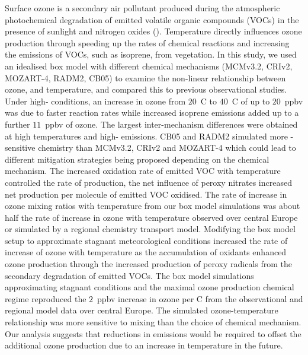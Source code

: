 Surface ozone is a secondary air pollutant produced during the atmospheric photochemical degradation of emitted volatile organic compounds (VOCs) in the presence of sunlight and nitrogen oxides (). 
Temperature directly influences ozone production through speeding up the rates of chemical reactions and increasing the emissions of VOCs, such as isoprene, from vegetation.
In this study, we used an idealised box model with different chemical mechanisms (MCMv3.2, CRIv2, MOZART-4, RADM2, CB05) to examine the non-linear relationship between ozone,  and temperature, and compared this to previous observational studies.
Under high- conditions, an increase in ozone from $20$~\degree C to $40$~\degree C of up to $20$~ppbv was due to faster reaction rates while increased isoprene emissions added up to a further $11$~ppbv of ozone.
The largest inter-mechanism differences were obtained at high temperatures and high- emissions.
CB05 and RADM2 simulated more -sensitive chemistry than MCMv3.2, CRIv2 and MOZART-4 which could lead to different mitigation strategies being proposed depending on the chemical mechanism.
The increased oxidation rate of emitted VOC with temperature controlled the rate of  production, the net influence of peroxy nitrates increased net  production per molecule of emitted VOC oxidised.
The rate of increase in ozone mixing ratios with temperature from our box model simulations was about half the rate of increase in ozone with temperature observed over central Europe or simulated by a regional chemistry transport model.
Modifying the box model setup to approximate stagnant meteorological conditions increased the rate of increase of ozone with temperature as the accumulation of oxidants enhanced ozone production through the increased production of peroxy radicals from the secondary degradation of emitted VOCs.
The box model simulations approximating stagnant conditions and the maximal ozone production chemical regime reproduced the $2$~ppbv increase in ozone per \degree C from the observational and regional model data over central Europe.
The simulated ozone-temperature relationship was more sensitive to mixing than the choice of chemical mechanism.
Our analysis suggests that reductions in  emissions would be required to offset the additional ozone production due to an increase in temperature in the future.
